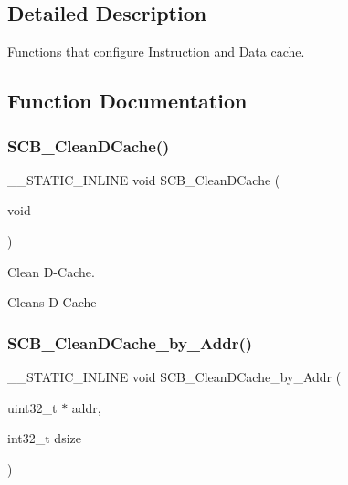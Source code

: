 \subsection{Detailed Description}
Functions that configure Instruction and Data cache. 



\subsection{Function Documentation}
\mbox{\label{group__CMSIS__Core__CacheFunctions_ga55583e3065c6eabca204b8b89b121c4c}} 
\subsubsection{\texorpdfstring{SCB\_CleanDCache()}{SCB\_CleanDCache()}}
{\footnotesize\ttfamily \+\_\+\+\_\+\+S\+T\+A\+T\+I\+C\+\_\+\+I\+N\+L\+I\+NE void S\+C\+B\+\_\+\+Clean\+D\+Cache (\begin{DoxyParamCaption}\item[{void}]{ }\end{DoxyParamCaption})}



Clean D-\/\+Cache. 

Cleans D-\/\+Cache \mbox{\label{group__CMSIS__Core__CacheFunctions_ga696fadbf7b9cc71dad42fab61873a40d}} 
\subsubsection{\texorpdfstring{SCB\_CleanDCache\_by\_Addr()}{SCB\_CleanDCache\_by\_Addr()}}
{\footnotesize\ttfamily \+\_\+\+\_\+\+S\+T\+A\+T\+I\+C\+\_\+\+I\+N\+L\+I\+NE void S\+C\+B\+\_\+\+Clean\+D\+Cache\+\_\+by\+\_\+\+Addr (\begin{DoxyParamCaption}\item[{uint32\+\_\+t $\ast$}]{addr,  }\item[{int32\+\_\+t}]{dsize }\end{DoxyParamCaption})}




